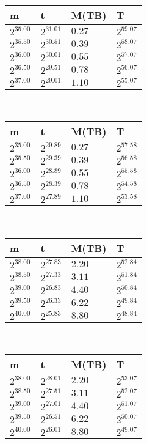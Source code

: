  \ 
\begin{tabular}{llll}
m & t & M(TB) & T \\ \hline
$2^{35.00}$ & $2^{31.01}$ & $0.27$ & $2^{59.07}$ \\
$2^{35.50}$ & $2^{30.51}$ & $0.39$ & $2^{58.07}$ \\
$2^{36.00}$ & $2^{30.01}$ & $0.55$ & $2^{57.07}$ \\
$2^{36.50}$ & $2^{29.51}$ & $0.78$ & $2^{56.07}$ \\
$2^{37.00}$ & $2^{29.01}$ & $1.10$ & $2^{55.07}$ \\
\end{tabular}
 \ 
\begin{tabular}{llll}
m & t & M(TB) & T \\ \hline
$2^{35.00}$ & $2^{29.89}$ & $0.27$ & $2^{57.58}$ \\
$2^{35.50}$ & $2^{29.39}$ & $0.39$ & $2^{56.58}$ \\
$2^{36.00}$ & $2^{28.89}$ & $0.55$ & $2^{55.58}$ \\
$2^{36.50}$ & $2^{28.39}$ & $0.78$ & $2^{54.58}$ \\
$2^{37.00}$ & $2^{27.89}$ & $1.10$ & $2^{53.58}$ \\
\end{tabular}
 \ 
\begin{tabular}{llll}
m & t & M(TB) & T \\ \hline
$2^{38.00}$ & $2^{27.83}$ & $2.20$ & $2^{52.84}$ \\
$2^{38.50}$ & $2^{27.33}$ & $3.11$ & $2^{51.84}$ \\
$2^{39.00}$ & $2^{26.83}$ & $4.40$ & $2^{50.84}$ \\
$2^{39.50}$ & $2^{26.33}$ & $6.22$ & $2^{49.84}$ \\
$2^{40.00}$ & $2^{25.83}$ & $8.80$ & $2^{48.84}$ \\
\end{tabular}
 \ 
\begin{tabular}{llll}
m & t & M(TB) & T \\ \hline
$2^{38.00}$ & $2^{28.01}$ & $2.20$ & $2^{53.07}$ \\
$2^{38.50}$ & $2^{27.51}$ & $3.11$ & $2^{52.07}$ \\
$2^{39.00}$ & $2^{27.01}$ & $4.40$ & $2^{51.07}$ \\
$2^{39.50}$ & $2^{26.51}$ & $6.22$ & $2^{50.07}$ \\
$2^{40.00}$ & $2^{26.01}$ & $8.80$ & $2^{49.07}$ \\
\end{tabular}
